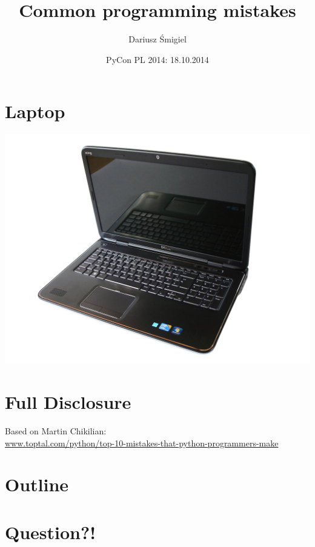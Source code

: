 \documentclass{beamer}
\title{Common programming mistakes}
\author{Dariusz Śmigiel}
\date{PyCon PL 2014: 18.10.2014}
\begin{document}
\begin{frame}
\titlepage
\end{frame}

\section*{Laptop}
\begin{frame}
    \includegraphics[width=1\textwidth]{images/dell_xps.jpg}
\end{frame}

\section*{Full Disclosure}
\begin{frame}
Based on Martin Chikilian:\\
\url{www.toptal.com/python/top-10-mistakes-that-python-programmers-make}
\end{frame}

\section*{Outline}
\begin{frame}
\tableofcontents
\end{frame}

\section{Question?!}
\end{document}
